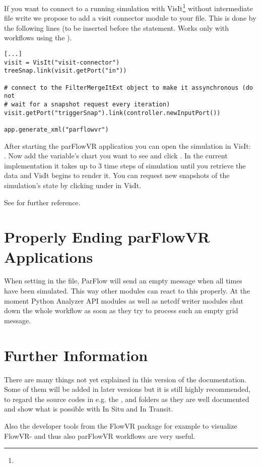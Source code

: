 If you want to connect to a running simulation with VisIt\footnote{}
without intermediate file write
we propose to add a visit connector module to your  file.
This is done by the following lines (to be inserted before the
 statement. Works only with workflows using the ).
\begin{display}\begin{verbatim}
[...]
visit = VisIt("visit-connector")
treeSnap.link(visit.getPort("in"))

# connect to the FilterMergeItExt object to make it assynchronous (do not
# wait for a snapshot request every iteration)
visit.getPort("triggerSnap").link(controller.newInputPort())

app.generate_xml("parflowvr")
\end{verbatim}\end{display}
After starting the parFlowVR application you can open the simulation in VisIt:\\
. Now add the variable's
chart you want to see and click . In the current implementation it takes up to 3 time steps of
simulation until you retrieve the data and VisIt begins
to render it. You can request new snapshots of the simulation's state by clicking
 under  in VisIt.

See  for further reference.

\section{Properly Ending parFlowVR Applications}
\label{section-Properly-ending-parFlowVR-applications}
When setting  in the  file, ParFlow will send an
empty message when all times have been simulated. This way other modules can react to this
properly. At the moment Python Analyzer API modules as well as netcdf writer modules
shut down the whole workflow as soon as they try to process such an empty grid message.

\section{Further Information}
There are many things not yet explained in this version of the documentation.
Some of them
will be added in later versions but it is still highly recommended, to regard the source codes in e.g.
the  , 
and  folders as they are well documented and show what is possible with In Situ and In Transit.

Also the developer tools from the FlowVR package for example  to
visualize FlowVR- and thus also parFlowVR workflows are very useful.
